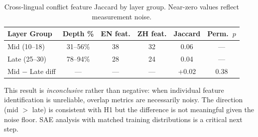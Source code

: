 \documentclass{article}
\begin{document}
\begin{table}[h]
\centering
\caption{Cross-lingual conflict feature Jaccard by layer group. Near-zero values reflect measurement noise.}
\label{tab:jaccard}
\begin{tabular}{lccccc}
\toprule
Layer Group & Depth \% & EN feat. & ZH feat. & Jaccard & Perm.\ $p$ \\
\midrule
Mid (10--18) & 31--56\% & 38 & 32 & 0.06 & --- \\
Late (25--30) & 78--94\% & 28 & 24 & 0.04 & --- \\
Mid $-$ Late diff & --- & --- & --- & +0.02 & 0.38 \\
\bottomrule
\end{tabular}
\end{table}

This result is \emph{inconclusive} rather than negative: when individual feature identification is unreliable, overlap metrics are necessarily noisy. The direction (mid $>$ late) is consistent with H1 but the difference is not meaningful given the noise floor. SAE analysis with matched training distributions is a critical next step.
\end{document}
